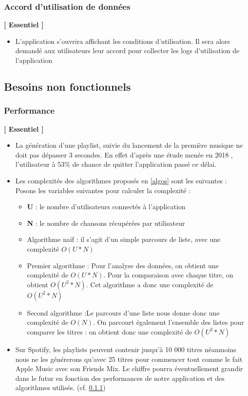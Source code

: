 \documentclass{article}
\begin{document}
		\subsubsection{Accord d'utilisation de données}
		\textbf{[ Essentiel ]}
		\begin{itemize}
			\item L'application s'ouvrira affichant les conditions d'utilisation. Il sera alors demandé aux utilisateurs leur accord pour collecter les logs d'utilisation de l'application
		\end{itemize}
		\newpage
		\subsection{Besoins non fonctionnels}
		\subsubsection{Performance} \label{performance}
		\textbf{[ Essentiel ]}
		\begin{itemize}
			\item La génération d'une playlist, suivie du lancement de la première musique ne doit pas dépasser 3 secondes. En effet d'après une étude menée en 2018 \cite{MobileSpeedGoogle2018}, l'utilisateur à 53\% de chance de quitter l'application passé ce délai.
			      			
			\item Les complexités des algorithmes proposés en \ref{algos} sont les suivantes : \newline
			      Posons les variables suivantes pour calculer la complexité : 
			      \begin{itemize}
			      	\item[] \textbf{U} : le nombre d'utilisateurs connectés à l'application
			      	\item[] \textbf{N} : le nombre de chansons récupérées par utilisateur
			      \end{itemize}
			      \begin{itemize}
			      	\item Algorithme naïf : il s'agit d'un simple parcours de liste, avec une complexité \textbf{$O(U*N)$}
			      	\item Premier algorithme : Pour l'analyse des données, on obtient une complexité de \textbf{$O(U*N)$}. Pour la comparaison avec chaque titre, on obtient \textbf{$O(U^2*N)$}. Cet algorithme a donc une complexité de \textbf{$O(U^2*N)$}
			      	\item Second algorithme :Le parcours d'une liste nous donne donc une complexité de \textbf{$O(N)$}. On parcourt également l'ensemble des listes pour comparer les titres : on obtient donc une complexité de \textbf{$O(U^2*N)$}
			      	      		
			      \end{itemize}
			\item Sur Spotify, les playlists peuvent contenir jusqu'à 10 000 titres néanmoins nous ne les générerons qu'avec 25 titres pour commencer tout comme le fait Apple Music avec son Friends Mix. Le chiffre pourra éventuellement grandir dans le futur en fonction des performances de notre application et des algorithmes utilisés. (cf. \ref{performance})
		\end{itemize}
\end{document}
